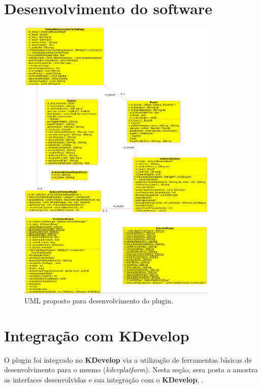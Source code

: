 \section{Desenvolvimento do software}

\begin{figure}[!htb]
  \centering
  \caption[UML proposto]{UML proposto para desenvolvimento do plugin.}
  \label{fig:uml}
  \includegraphics[width=0.85\textwidth]{figuras/uml.png}
\end{figure}


\section{Integração com KDevelop}

O plugin foi integrado no \textbf{KDevelop} via a utilização de ferramentas básicas de desenvolvimento para o mesmo (\textit{kdevplatform}). Nesta seção, sera posta a amostra as interfaces desenvolvidas e sua integração com o \textbf{KDevelop}, .

